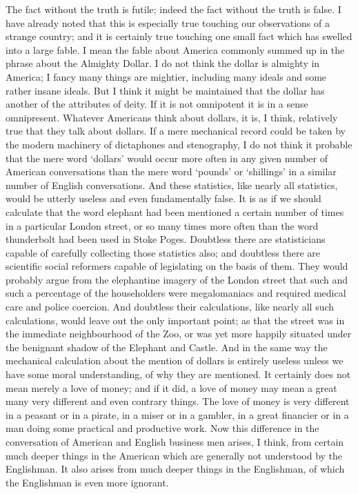 \documentclass{book}
\begin{document}
The fact without the truth is futile; indeed the fact without the truth is false. I have already noted that this is especially true touching our observations of a strange country; and it is certainly true touching one small fact which has swelled into a large fable. I mean the fable about America commonly summed up in the phrase about the Almighty Dollar. I do not think the dollar is almighty in America; I fancy many things are mightier, including many ideals and some rather insane ideals. But I think it might be maintained that the dollar has another of the attributes of deity. If it is not omnipotent it is in a sense omnipresent. Whatever Americans think about dollars, it is, I think, relatively true that they talk about dollars. If a mere mechanical record could be taken by the modern machinery of dictaphones and stenography, I do not think it probable that the mere word ‘dollars’ would occur more often in any given number of American conversations than the mere word ‘pounds’ or ‘shillings’ in a similar number of English conversations. And these statistics, like nearly all statistics, would be utterly useless and even fundamentally false. It is as if we should calculate that the word elephant had been mentioned a certain number of times in a particular London street, or so many times more often than the word thunderbolt had been used in Stoke Poges. Doubtless there are statisticians capable of carefully collecting those statistics also; and doubtless there are scientific social reformers capable of legislating on the basis of them. They would probably argue from the elephantine imagery of the London street that such and such a percentage of the householders were megalomaniacs and required medical care and police coercion. And doubtless their calculations, like nearly all such calculations, would leave out the only important point; as that the street was in the immediate neighbourhood of the Zoo, or was yet more happily situated under the benignant shadow of the Elephant and Castle. And in the same way the mechanical calculation about the mention of dollars is entirely useless unless we have some moral understanding, of why they are mentioned. It certainly does not mean merely a love of money; and if it did, a love of money may mean a great many very different and even contrary things. The love of money is very different in a peasant or in a pirate, in a miser or in a gambler, in a great financier or in a man doing some practical and productive work. Now this difference in the conversation of American and English business men arises, I think, from certain much deeper things in the American which are generally not understood by the Englishman. It also arises from much deeper things in the Englishman, of which the Englishman is even more ignorant.
\end{document}
